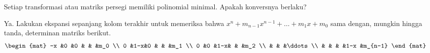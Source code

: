 \begin{exercises}
  \item
    Setiap transformasi atau matriks persegi memiliki polinomial minimal.
    Apakah konversnya berlaku?
    \begin{answer}
      Ya.
      Lakukan ekspansi sepanjang kolom terakhir untuk memeriksa bahwa
      \( x^n+m_{n-1}x^{n-1}+\dots+m_1x+m_0 \) sama dengan, mungkin hingga tanda,
      determinan matriks berikut.
      \begin{equation*}
         \begin{mat}
            -x  &0  &0  &      &    &m_0    \\
             0  &1-x&0  &      &    &m_1    \\
             0  &0  &1-x&      &    &m_2    \\
                &   &   &\ddots             \\
                &   &   &      &1-x &m_{n-1}
         \end{mat}
      \end{equation*} 
     \end{answer}
\end{exercises}












